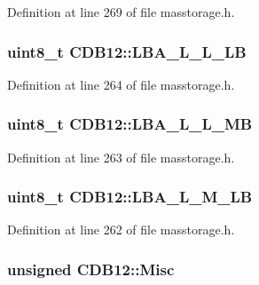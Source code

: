 \-Definition at line 269 of file masstorage.\-h.

\hypertarget{struct_c_d_b12_aa95a1e5187a93f331b34c5aaf05e0cf6}{
\subsubsection[{\-L\-B\-A\-\_\-\-L\-\_\-\-L\-\_\-\-L\-B}]{\setlength{\rightskip}{0pt plus 5cm}uint8\-\_\-t {\bf \-C\-D\-B12\-::\-L\-B\-A\-\_\-\-L\-\_\-\-L\-\_\-\-L\-B}}}\label{struct_c_d_b12_aa95a1e5187a93f331b34c5aaf05e0cf6}


\-Definition at line 264 of file masstorage.\-h.

\hypertarget{struct_c_d_b12_a40bc765adf21818c3a1bc3c8ffeabc94}{
\subsubsection[{\-L\-B\-A\-\_\-\-L\-\_\-\-L\-\_\-\-M\-B}]{\setlength{\rightskip}{0pt plus 5cm}uint8\-\_\-t {\bf \-C\-D\-B12\-::\-L\-B\-A\-\_\-\-L\-\_\-\-L\-\_\-\-M\-B}}}\label{struct_c_d_b12_a40bc765adf21818c3a1bc3c8ffeabc94}


\-Definition at line 263 of file masstorage.\-h.

\hypertarget{struct_c_d_b12_a6fb44effe62ecb8ec0de742b836fe194}{
\subsubsection[{\-L\-B\-A\-\_\-\-L\-\_\-\-M\-\_\-\-L\-B}]{\setlength{\rightskip}{0pt plus 5cm}uint8\-\_\-t {\bf \-C\-D\-B12\-::\-L\-B\-A\-\_\-\-L\-\_\-\-M\-\_\-\-L\-B}}}\label{struct_c_d_b12_a6fb44effe62ecb8ec0de742b836fe194}


\-Definition at line 262 of file masstorage.\-h.

\hypertarget{struct_c_d_b12_af59803ec81c006b7bdefc03d80579d07}{
\subsubsection[{\-Misc}]{\setlength{\rightskip}{0pt plus 5cm}unsigned {\bf \-C\-D\-B12\-::\-Misc}}}\label{struct_c_d_b12_af59803ec81c006b7bdefc03d80579d07}


